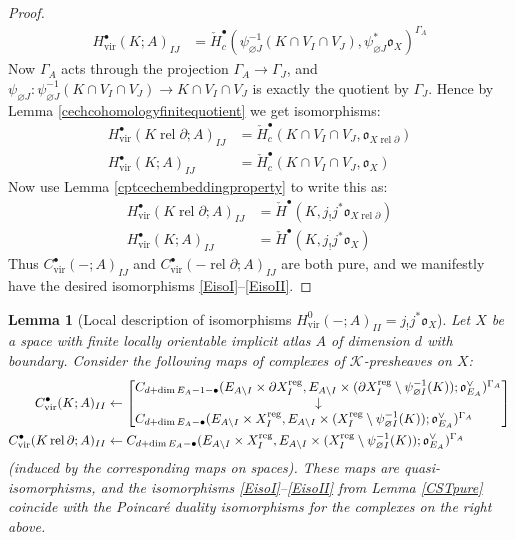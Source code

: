 \documentclass[12pt]{article}
\newtheorem{lemma}[theorem]{Lemma}
\theoremstyle{definition}
\theoremstyle{remark}
\numberwithin{equation}{subsection}
\newcommand{\K}{\mathcal K}
\newcommand{\oo}{\mathfrak o}
\newcommand{\cH}{\check H}
\newcommand{\vir}{\mathrm{vir}}
\newcommand{\reg}{\mathrm{reg}}
\newcommand{\rel}{\operatorname{rel}}
\begin{document}
\begin{proof}
\begin{align}
H^\bullet_\vir(K;A)_{IJ}&=\cH^\bullet_c(\psi_{\varnothing J}^{-1}(K\cap V_I\cap V_J),\psi_{\varnothing J}^\ast\oo_X)^{\Gamma_A}
\end{align}
Now $\Gamma_A$ acts through the projection $\Gamma_A\to\Gamma_J$, and $\psi_{\varnothing J}:\psi_{\varnothing J}^{-1}(K\cap V_I\cap V_J)\to K\cap V_I\cap V_J$ is exactly the quotient by $\Gamma_J$.  Hence by Lemma \ref{cechcohomologyfinitequotient} we get isomorphisms:
\begin{align}
H^\bullet_\vir(K\rel\partial;A)_{IJ}&=\cH^\bullet_c(K\cap V_I\cap V_J,\oo_{X\rel\partial})\\
H^\bullet_\vir(K;A)_{IJ}&=\cH^\bullet_c(K\cap V_I\cap V_J,\oo_X)
\end{align}
Now use Lemma \ref{cptcechembeddingproperty} to write this as:
\begin{align}
H^\bullet_\vir(K\rel\partial;A)_{IJ}&=\cH^\bullet(K,j_!j^\ast\oo_{X\rel\partial})\\
H^\bullet_\vir(K;A)_{IJ}&=\cH^\bullet(K,j_!j^\ast\oo_X)
\end{align}
Thus $C^\bullet_\vir(-;A)_{IJ}$ and $C^\bullet_\vir(-\rel\partial;A)_{IJ}$ are both pure, and we manifestly have the desired isomorphisms \eqref{EisoI}--\eqref{EisoII}.
\end{proof}

\begin{lemma}[Local description of isomorphisms $H^0_\vir(-;A)_{II}=j_!j^\ast\oo_X$]\label{localdescofISO}
Let $X$ be a space with finite locally orientable implicit atlas $A$ of dimension $d$ with boundary.  Consider the following maps of complexes of $\K$-presheaves on $X$:
\begin{align}
C^\bullet_\vir(K;A)_{II}&\leftarrow\left[\begin{matrix}C_{d+\dim E_A-1-\bullet}(E_{A\setminus I}\times\partial X_I^\reg,E_{A\setminus I}\times(\partial X_I^\reg\setminus\psi_{\varnothing I}^{-1}(K));\oo_{E_A}^\vee)^{\Gamma_A}\hfill\cr\downarrow\cr C_{d+\dim E_A-\bullet}(E_{A\setminus I}\times X_I^\reg,E_{A\setminus I}\times(X_I^\reg\setminus\psi_{\varnothing I}^{-1}(K));\oo_{E_A}^\vee)^{\Gamma_A}\hfill\end{matrix}\right]\\
C^\bullet_\vir(K\rel\partial;A)_{II}&\leftarrow C_{d+\dim E_A-\bullet}(E_{A\setminus I}\times X_I^\reg,E_{A\setminus I}\times(X_I^\reg\setminus\psi_{\varnothing I}^{-1}(K));\oo_{E_A}^\vee)^{\Gamma_A}
\end{align}
(induced by the corresponding maps on spaces).  These maps are quasi-isomorphisms, and the isomorphisms \eqref{EisoI}--\eqref{EisoII} from Lemma \ref{CSTpure} coincide with the Poincar\'e duality isomorphisms for the complexes on the right above.
\end{lemma}
\end{document}
